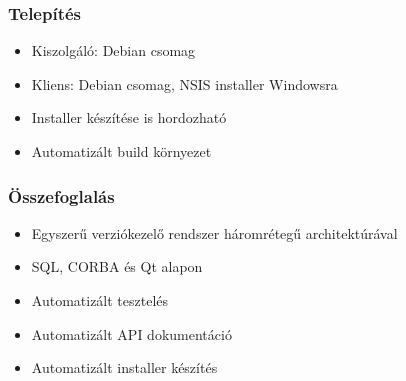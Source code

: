 \documentclass[hyperref={pdfpagelabels=false}]{beamer}
\begin{document}
\begin{frame}
\frametitle{Telepítés}
\begin{itemize}
\item Kiszolgáló: Debian csomag
\item Kliens: Debian csomag, NSIS installer Windowsra
\item Installer készítése is hordozható
\item Automatizált build környezet
\end{itemize}
\end{frame}

\begin{frame}
\frametitle{Összefoglalás}
\begin{itemize}
\item Egyszerű verziókezelő rendszer háromrétegű architektúrával
\item SQL, CORBA és Qt alapon
\item Automatizált tesztelés
\item Automatizált API dokumentáció
\item Automatizált installer készítés
\end{itemize}
\end{frame}
\end{document}
